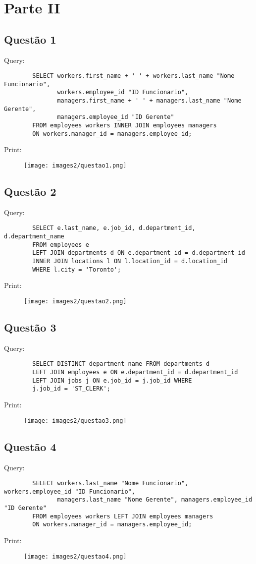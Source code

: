 \documentclass{article}[twocolumn]
\begin{document}
	\section{Parte II}
	\subsection{Quest\~ao 1}
	Query:
	\begin{verbatim}
		SELECT workers.first_name + ' ' + workers.last_name "Nome Funcionario",
		       workers.employee_id "ID Funcionario",
		       managers.first_name + ' ' + managers.last_name "Nome Gerente",
		       managers.employee_id "ID Gerente"
		FROM employees workers INNER JOIN employees managers
		ON workers.manager_id = managers.employee_id;
	\end{verbatim}
	Print:
	\begin{figure}[H]
		\centering
		\texttt{[image: images2/questao1.png]}
	\end{figure}
	\newpage
	\subsection{Quest\~ao 2}
	Query:
	\begin{verbatim}
		SELECT e.last_name, e.job_id, d.department_id, d.department_name
		FROM employees e
		LEFT JOIN departments d ON e.department_id = d.department_id
		INNER JOIN locations l ON l.location_id = d.location_id
		WHERE l.city = 'Toronto';
	\end{verbatim}
	Print:
	\begin{figure}[H]
		\centering
		\texttt{[image: images2/questao2.png]}
	\end{figure}
	\newpage
	\subsection{Quest\~ao 3}
	Query:
	\begin{verbatim}
		SELECT DISTINCT department_name FROM departments d
		LEFT JOIN employees e ON e.department_id = d.department_id
		LEFT JOIN jobs j ON e.job_id = j.job_id WHERE
		j.job_id = 'ST_CLERK';
	\end{verbatim}
	Print:
	\begin{figure}[H]
		\centering
		\texttt{[image: images2/questao3.png]}
	\end{figure}
	\newpage
	\subsection{Quest\~ao 4}
	Query:
	\begin{verbatim}
		SELECT workers.last_name "Nome Funcionario", workers.employee_id "ID Funcionario",
		       managers.last_name "Nome Gerente", managers.employee_id "ID Gerente"
		FROM employees workers LEFT JOIN employees managers
		ON workers.manager_id = managers.employee_id;
	\end{verbatim}
	Print:
	\begin{figure}[H]
		\centering
		\texttt{[image: images2/questao4.png]}
	\end{figure}
	\newpage
\end{document}
